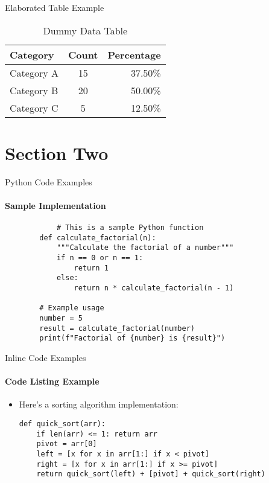 \documentclass[10pt,aspectratio=169]{beamer}
\newenvironment{centeredcode}{\begin{center}}{\end{center}}
\begin{document}
\begin{frame}{Elaborated Table Example}
    \begin{table}
        \centering
        \caption{Dummy Data Table}
        \begin{tabular}{|l|c|r|}
            \hline
            \textbf{Category} & \textbf{Count} & \textbf{Percentage} \\ \hline
            Category A & 15 & 37.50\% \\ \hline
            Category B & 20 & 50.00\% \\ \hline
            Category C & 5  & 12.50\% \\ \hline
        \end{tabular}
    \end{table}
\end{frame}

\section{Section Two}

\begin{frame}[fragile]{Python Code Examples}
    \framesubtitle{Sample Implementation}
    \begin{centeredcode}
        \begin{verbatim}
            # This is a sample Python function
        def calculate_factorial(n):
            """Calculate the factorial of a number"""
            if n == 0 or n == 1:
                return 1
            else:
                return n * calculate_factorial(n - 1)

        # Example usage
        number = 5
        result = calculate_factorial(number)
        print(f"Factorial of {number} is {result}")
    \end{verbatim}
    \end{centeredcode}
\end{frame}

\begin{frame}[fragile]{Inline Code Examples}
    \framesubtitle{Code Listing Example}
    \begin{itemize}
        \item Here's a sorting algorithm implementation:
        \begin{verbatim}
def quick_sort(arr):
    if len(arr) <= 1: return arr
    pivot = arr[0]
    left = [x for x in arr[1:] if x < pivot]
    right = [x for x in arr[1:] if x >= pivot]
    return quick_sort(left) + [pivot] + quick_sort(right)
        \end{verbatim}
    \end{itemize}
\end{frame}
\end{document}
